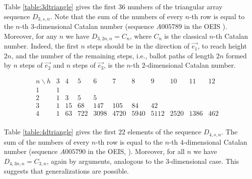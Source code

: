 \documentclass[12pt,notitlepage]{amsart}
\numberwithin{equation}{section}
\theoremstyle{thmstyleone}%
\theoremstyle{thmstyletwo}%
\theoremstyle{thmstylethree}%
\numberwithin{theorem}{section}
\numberwithin{equation}{section}
\begin{document}
Table \ref{table:3dtriangle} gives the first $36$ numbers of the triangular array sequence $D_{3,s,n}$. Note that the sum of the numbers of every $n$-th row is equal to the $n$-th $3$-dimensional Catalan number (sequence $A005789$ in the OEIS \cite{oeis}). Moreover, for any $n$ we have $D_{3,2n,n} = C_n$, where $C_n$ is the classical $n$-th Catalan number. Indeed, the first $n$ steps should be in the direction of $\vec{e_1}$, to reach height $2n$, and the number of the remaining steps, i.e., ballot paths of length $2n$ formed by $n$ steps of $\vec{e_2}$ and $n$ steps of $\vec{e_3}$, is the $n$-th $2$-dimensional Catalan number. 

\begin{table}[h]
    \centering
 \[
\begin{array}{c|ccccccccccc} n \backslash h & 3 & 4 & 5 & 6 & 7 & 8 & 9 & 10 & 11 & 12 \\
\hline
1 & 1  \\
2 & 1 & 3 & 5 & 5 \\
3 & 1 & 15 & 68 & 147 & 105 & 84 & 42 \\
4 & 1 & 63 & 722 & 3098 & 4720 & 5940 & 5112 & 2520 & 1386 & 462\\
\end{array}
\] 

    \caption{The $4$-dimensional Balanced-Ballot-Path-Height triangle}
    \label{table:4dtriangle}
\end{table}

 Table \ref{table:4dtriangle} gives the first $22$ elements of the sequence $D_{4,s,n}$. The sum of the numbers of every $n$-th row is equal to the $n$-th $4$-dimensional Catalan number (sequence $A005790$ in the OEIS, \cite{oeis}). Moreover, for all $n$ we have $D_{4,3n,n} = C_{3,n}$, again by arguments, analogous to the $3$-dimensional case. This suggests that generalizations are possible.
\smallskip

\end{document}
